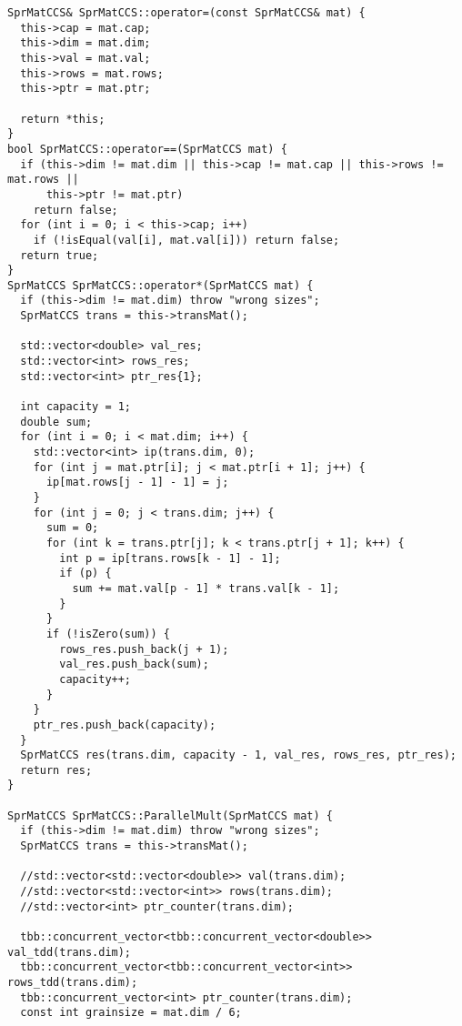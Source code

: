 \documentclass{report}
\begin{document}
\begin{lstlisting}
SprMatCCS& SprMatCCS::operator=(const SprMatCCS& mat) {
  this->cap = mat.cap;
  this->dim = mat.dim;
  this->val = mat.val;
  this->rows = mat.rows;
  this->ptr = mat.ptr;

  return *this;
}
bool SprMatCCS::operator==(SprMatCCS mat) {
  if (this->dim != mat.dim || this->cap != mat.cap || this->rows != mat.rows ||
      this->ptr != mat.ptr)
    return false;
  for (int i = 0; i < this->cap; i++)
    if (!isEqual(val[i], mat.val[i])) return false;
  return true;
}
SprMatCCS SprMatCCS::operator*(SprMatCCS mat) {
  if (this->dim != mat.dim) throw "wrong sizes";
  SprMatCCS trans = this->transMat();

  std::vector<double> val_res;
  std::vector<int> rows_res;
  std::vector<int> ptr_res{1};

  int capacity = 1;
  double sum;
  for (int i = 0; i < mat.dim; i++) {
    std::vector<int> ip(trans.dim, 0);
    for (int j = mat.ptr[i]; j < mat.ptr[i + 1]; j++) {
      ip[mat.rows[j - 1] - 1] = j;
    }
    for (int j = 0; j < trans.dim; j++) {
      sum = 0;
      for (int k = trans.ptr[j]; k < trans.ptr[j + 1]; k++) {
        int p = ip[trans.rows[k - 1] - 1];
        if (p) {
          sum += mat.val[p - 1] * trans.val[k - 1];
        }
      }
      if (!isZero(sum)) {
        rows_res.push_back(j + 1);
        val_res.push_back(sum);
        capacity++;
      }
    }
    ptr_res.push_back(capacity);
  }
  SprMatCCS res(trans.dim, capacity - 1, val_res, rows_res, ptr_res);
  return res;
}

SprMatCCS SprMatCCS::ParallelMult(SprMatCCS mat) {
  if (this->dim != mat.dim) throw "wrong sizes";
  SprMatCCS trans = this->transMat();

  //std::vector<std::vector<double>> val(trans.dim);
  //std::vector<std::vector<int>> rows(trans.dim);
  //std::vector<int> ptr_counter(trans.dim);

  tbb::concurrent_vector<tbb::concurrent_vector<double>> val_tdd(trans.dim);
  tbb::concurrent_vector<tbb::concurrent_vector<int>> rows_tdd(trans.dim);
  tbb::concurrent_vector<int> ptr_counter(trans.dim);
  const int grainsize = mat.dim / 6;


\end{lstlisting}
\end{document}
